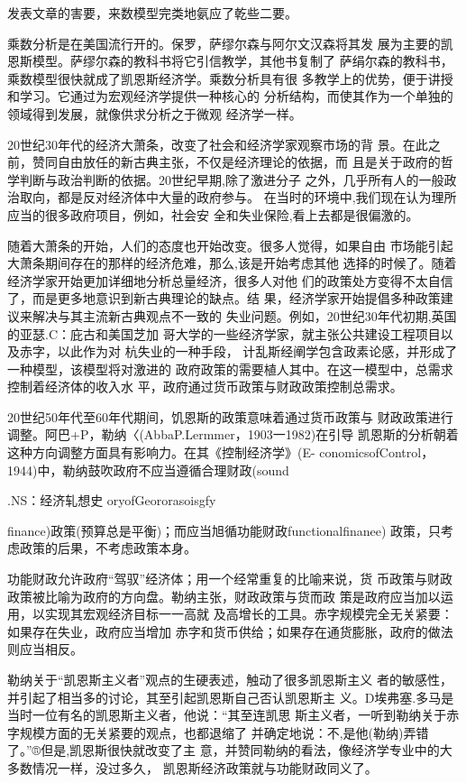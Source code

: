 发表文章的害要，来数模型完类地氨应了乾些二要。

乘数分析是在美国流行开的。保罗，萨缪尔森与阿尔文汉森将其发
展为主要的凯恩斯模型。萨缪尔森的教科书将它引信教学，其他书复制了
萨绢尔森的教科书，乘数模型很快就成了凯恩斯经济学。乘数分析具有很
多教学上的优势，便于讲授和学习。它通过为宏观经济学提供一种核心的
分析结构，而使其作为一个单独的领域得到发展，就像供求分析之于微观
经济学一样。

20世纪30年代的经济大萧条，改变了社会和经济学家观察市场的背
景。在此之前，赞同自由放任的新古典主张，不仅是经济理论的依据，而
且是关于政府的哲学判断与政治判断的依据。20世纪早期,除了激进分子
之外，几乎所有人的一般政治取向，都是反对经济体中大量的政府参与。
在当时的环境中,我们现在认为理所应当的很多政府项目，例如，社会安
全和失业保险,看上去都是很偏激的。

随着大萧条的开始，人们的态度也开始改变。很多人觉得，如果自由
市场能引起大萧条期间存在的那样的经济危难，那么,该是开始考虑其他
选择的时候了。随着经济学家开始更加详细地分析总量经济，很多人对他
们的政策处方变得不太自信了，而是更多地意识到新古典理论的缺点。结
果，经济学家开始提倡多种政策建议来解决与其主流新古典观点不一致的
失业问题。例如，20世纪30年代初期,英国的亚瑟.C：庇古和美国芝加
哥大学的一些经济学家，就主张公共建设工程项目以及赤字，以此作为对
杭失业的一种手段，
计乱斯经阐学包含政素论感，并形成了一种模型，该模型将对激进的
政府政策的需要植人其中。在这一模型中，总需求控制着经济体的收入水
平，政府通过货币政策与财政政策控制总需求。

20世纪50年代至60年代期间，饥恩斯的政策意味着通过货币政策与
财政政策进行调整。阿巴+P，勒纳〈(AbbaP.Lermmer，1903一1982)在引导
凯恩斯的分析朝着这种方向调整方面具有影响力。在其《控制经济学》(E-
conomicsofControl，1944)中，勒纳鼓吹政府不应当遵循合理财政(sound

.NS：经济轧想史
oryofGeororasoisgfy

finance)政策(预算总是平衡)；而应当旭循功能财政functionalfinanee)
政策，只考虑政策的后果，不考虑政策本身。

功能财政允许政府“驾驭”经济体；用一个经常重复的比喻来说，货
币政策与财政政策被比喻为政府的方向盘。勒纳主张，财政政策与货而政
策是政府应当加以运用，以实现其宏观经济目标一一高就
及高增长的工具。赤字规模完全无关紧要：如果存在失业，政府应当增加
赤字和货币供给；如果存在通货膨胀，政府的做法则应当相反。

勒纳关于“凯恩斯主义者”观点的生硬表述，触动了很多凯恩斯主义
者的敏感性，并引起了相当多的讨论，其至引起凯恩斯自己否认凯恩斯主
义。D埃弗塞.多马是当时一位有名的凯恩斯主义者，他说：“其至连凯思
斯主义者，一听到勒纳关于赤字规模方面的无关紧要的观点，也都退缩了
并确定地说：不,是他(勒纳)弄错了。”®但是,凯恩斯很快就改变了主
意，并赞同勒纳的看法，像经济学专业中的大多数情况一样，没过多久，
凯恩斯经济政策就与功能财政同义了。

